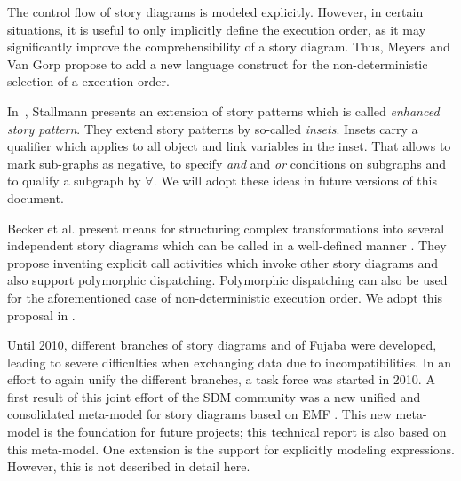 The control flow of story diagrams is modeled explicitly.
However, in certain situations, it is useful to only implicitly define the execution order, as it may significantly improve the comprehensibility of a story diagram.
Thus, Meyers and Van Gorp \cite{MG08} propose to add a new language construct for the non-deterministic selection of a execution order.

In~\cite{Sta08}, Stallmann presents an extension of story patterns which is called \emph{enhanced story pattern}. They extend story patterns by so-called \emph{insets}. Insets carry a qualifier which applies to all object and link variables in the inset. That allows to mark sub-graphs as negative, to specify \emph{and} and \emph{or} conditions on subgraphs and to qualify a subgraph by $\forall$. We will adopt these ideas in future versions of this document.

Becker et al. present means for structuring complex transformations into several independent story diagrams which can be called in a well-defined manner \cite{BvDHR11}.
They propose inventing explicit call activities which invoke other story diagrams and also support polymorphic dispatching.
Polymorphic dispatching can also be used for the aforementioned case of non-deterministic execution order.
We adopt this proposal in .

Until 2010, different branches of story diagrams and of Fujaba were developed, leading to severe difficulties when exchanging data due to incompatibilities.
In an effort to again unify the different branches, a task force was started in 2010.
A first result of this joint effort of the SDM community was a new unified and consolidated meta-model for story diagrams based on EMF \cite{HRvD+11}.
This new meta-model is the foundation for future projects; this technical report is also based on this meta-model.
One extension is the support for explicitly modeling expressions.
However, this is not described in detail here.







